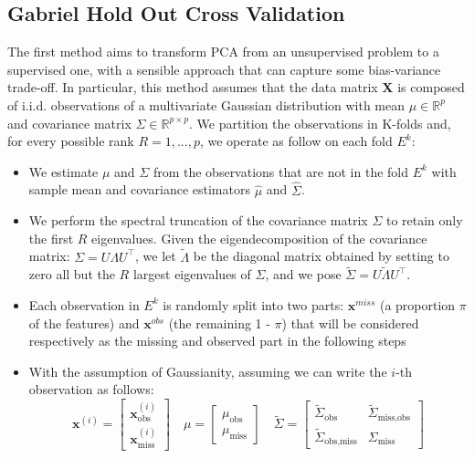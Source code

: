 \documentclass{article}
\begin{document}
\subsection{Gabriel Hold Out Cross Validation}
The first method aims to transform PCA from an unsupervised problem to a supervised one, with a sensible approach that can capture some bias-variance trade-off. In particular, this method assumes that the data matrix \textbf{X} is composed of i.i.d. observations of a multivariate Gaussian distribution with mean $\mu \in \mathbb{R}^p$ and covariance matrix $\Sigma \in \mathbb{R}^{p \times p}$. We partition the observations in K-folds and, for every possible rank $R = 1, ..., p$, we operate as follow on each fold $E^k$:
\begin{itemize}
	\item We estimate $\mu$ and $\Sigma$ from the observations that are not in the fold $E^k$ with sample mean and covariance estimators $\hat{\mu}$ and $\hat{\Sigma}$. 
	\item We perform the spectral truncation of the covariance matrix $\Sigma$ to retain only the first $R$ eigenvalues.
          Given the eigendecomposition of the covariance matrix: $\Sigma = U \Lambda U^\top$, we let $\tilde{\Lambda}$ be 
          the diagonal matrix obtained by setting to zero all but the $R$ largest eigenvalues of $\Sigma$, and we pose
          $\tilde{\Sigma} = U \tilde{\Lambda} U^\top$.
          \item Each observation in $E^k$ is randomly split into two parts: $\textbf{x}^{miss}$ (a proportion $\pi$ of the features) and $\textbf{x}^{obs}$ (the remaining 1 - $\pi$)  that will be considered respectively as the missing and observed part in the following steps
	\item With the assumption of Gaussianity, assuming we can write the $i$-th observation as follows:
	$$
	\textbf{x}^{(i)} = \begin{bmatrix} \textbf{x}^{(i)}_\text{obs} \\ \textbf{x}^{(i)}_\text{miss} \end{bmatrix} \quad
                \mu = \begin{bmatrix} \mu_\text{obs} \\ \mu_\text{miss} \end{bmatrix} \quad
                \tilde{\Sigma} = \begin{bmatrix} \tilde{\Sigma}_{\text{obs}} & \tilde{\Sigma}_\text{miss,obs} \\ \tilde{\Sigma}_\text{obs,miss} & \Sigma_{\text{miss}} \end{bmatrix}
$$
\end{itemize}
\end{document}
